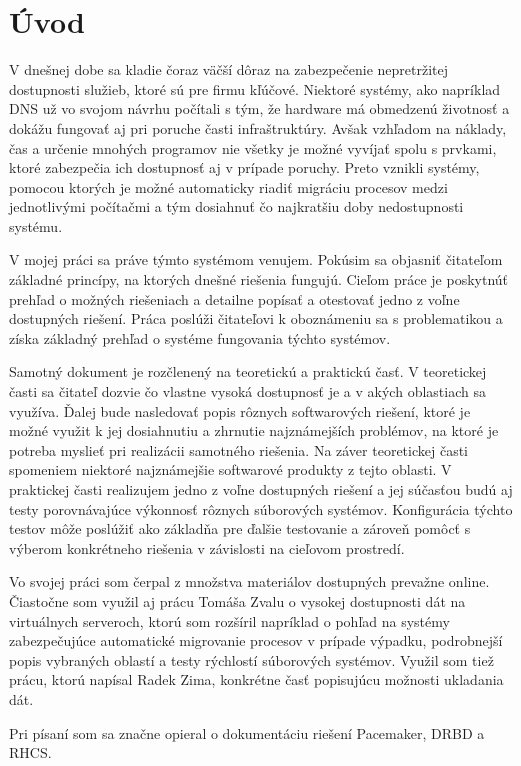 \chapter*{Úvod}

V dnešnej dobe sa kladie čoraz väčší dôraz na zabezpečenie nepretržitej dostupnosti služieb, ktoré sú pre firmu kľúčové. Niektoré systémy, ako napríklad DNS už vo svojom návrhu počítali s tým, že hardware má obmedzenú životnosť a dokážu fungovať aj pri poruche časti infraštruktúry. Avšak vzhľadom na náklady, čas a určenie mnohých programov nie všetky je možné vyvíjať spolu s prvkami, ktoré zabezpečia ich dostupnosť aj v prípade poruchy. Preto vznikli systémy, pomocou ktorých je možné automaticky riadiť migráciu procesov medzi jednotlivými počítačmi a tým dosiahnuť čo najkratšiu doby nedostupnosti systému.

V mojej práci sa práve týmto systémom venujem. Pokúsim sa objasniť čitateľom základné princípy, na ktorých dnešné riešenia fungujú. Cieľom práce je poskytnúť prehľad o možných riešeniach a detailne popísať a otestovať jedno z voľne dostupných riešení. Práca poslúži čitateľovi k oboznámeniu sa s problematikou a získa základný prehľad o systéme fungovania týchto systémov.

Samotný dokument je rozčlenený na teoretickú a praktickú časť. V teoretickej časti sa čitateľ dozvie čo vlastne vysoká dostupnosť je a v akých oblastiach sa využíva. Ďalej bude nasledovať popis rôznych softwarových riešení, ktoré je možné využit k jej dosiahnutiu a zhrnutie najznámejších problémov, na ktoré je potreba myslieť pri realizácii samotného riešenia. Na záver teoretickej časti spomeniem niektoré najznámejšie softwarové produkty z tejto oblasti. V praktickej časti realizujem jedno z voľne dostupných riešení a jej súčasťou budú aj testy porovnávajúce výkonnosť rôznych súborových systémov. Konfigurácia týchto testov môže poslúžiť ako základňa pre ďalšie testovanie a zároveň pomôcť s výberom konkrétneho riešenia v závislosti na cieľovom prostredí.

Vo svojej práci som čerpal z množstva materiálov dostupných prevažne online. Čiastočne som využil aj prácu Tomáša Zvalu\cite{tomaszvala} o vysokej dostupnosti dát na virtuálnych serveroch, ktorú som rozšíril napríklad o pohľad na systémy zabezpečujúce automatické migrovanie procesov v prípade výpadku, podrobnejší popis vybraných oblastí a testy rýchlostí súborových systémov. Využil som tiež prácu, ktorú napísal Radek Zima\cite{radekzima}, konkrétne časť popisujúcu možnosti ukladania dát.

Pri písaní som sa značne opieral o dokumentáciu riešení Pacemaker, DRBD a RHCS.

\emptydoublepage